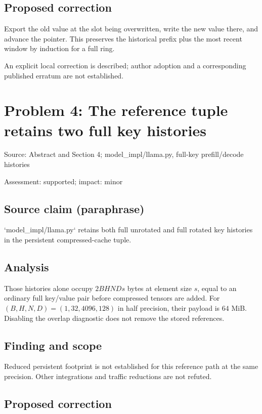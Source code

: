 \documentclass[11pt]{article}
\begin{document}
\subsection*{Proposed correction}

Export the old value at the slot being overwritten, write the new value there, and advance the pointer. This preserves the historical prefix plus the most recent window by induction for a full ring.

An explicit local correction is described; author adoption and a corresponding published erratum are not established.

\section*{Problem 4: The reference tuple retains two full key histories}

Source: Abstract and Section 4; model\_impl/llama.py, full-key prefill/decode histories

Assessment: supported; impact: minor

\subsection*{Source claim (paraphrase)}

`model\_impl/llama.py` retains both full unrotated and full rotated key histories in the persistent compressed-cache tuple.

\subsection*{Analysis}

Those histories alone occupy \(2BHNDs\) bytes at element size \(s\), equal to an ordinary full key/value pair before compressed tensors are added. For \((B,H,N,D)=(1,32,4096,128)\) in half precision, their payload is \(64\) MiB. Disabling the overlap diagnostic does not remove the stored references.

\subsection*{Finding and scope}

Reduced persistent footprint is not established for this reference path at the same precision. Other integrations and traffic reductions are not refuted.

\subsection*{Proposed correction}
\end{document}
